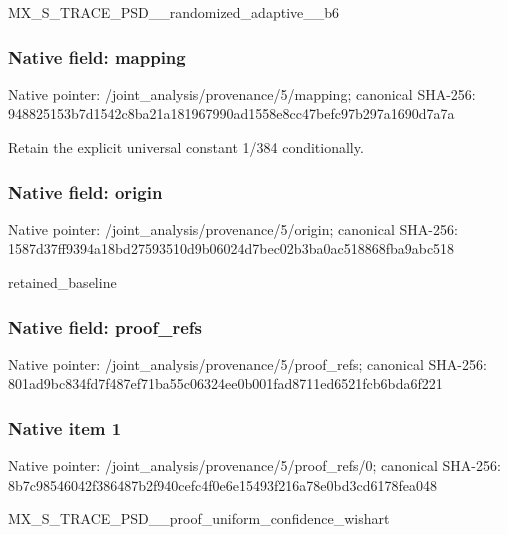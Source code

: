 \documentclass[10pt,a4paper]{article}
\begin{document}
\begingroup\raggedright\sloppy MX\_\allowbreak{}S\_\allowbreak{}TRACE\_\allowbreak{}PSD\_\allowbreak{}\_\allowbreak{}randomized\_\allowbreak{}adaptive\_\allowbreak{}\_\allowbreak{}b6\par\endgroup

\subsubsection{Native field: mapping}
Native pointer: /joint\_\allowbreak{}analysis/provenance/5/mapping; canonical SHA-256: 948825153b7d1542c8ba21a181967990ad1558e8cc47befc97b297a1690d7a7a

\begingroup\raggedright\sloppy Retain the explicit universal constant 1/\allowbreak{}384 conditionally.\par\endgroup

\subsubsection{Native field: origin}
Native pointer: /joint\_\allowbreak{}analysis/provenance/5/origin; canonical SHA-256: 1587d37ff9394a18bd27593510d9b06024d7bec02b3ba0ac518868fba9abc518

\begingroup\raggedright\sloppy retained\_\allowbreak{}baseline\par\endgroup

\subsubsection{Native field: proof\_\allowbreak{}refs}
Native pointer: /joint\_\allowbreak{}analysis/provenance/5/proof\_\allowbreak{}refs; canonical SHA-256: 801ad9bc834fd7f487ef71ba55c06324ee0b001fad8711ed6521fcb6bda6f221

\subsubsection{Native item 1}
Native pointer: /joint\_\allowbreak{}analysis/provenance/5/proof\_\allowbreak{}refs/0; canonical SHA-256: 8b7c98546042f386487b2f940cefc4f0e6e15493f216a78e0bd3cd6178fea048

\begingroup\raggedright\sloppy MX\_\allowbreak{}S\_\allowbreak{}TRACE\_\allowbreak{}PSD\_\allowbreak{}\_\allowbreak{}proof\_\allowbreak{}uniform\_\allowbreak{}confidence\_\allowbreak{}wishart\par\endgroup
\end{document}
